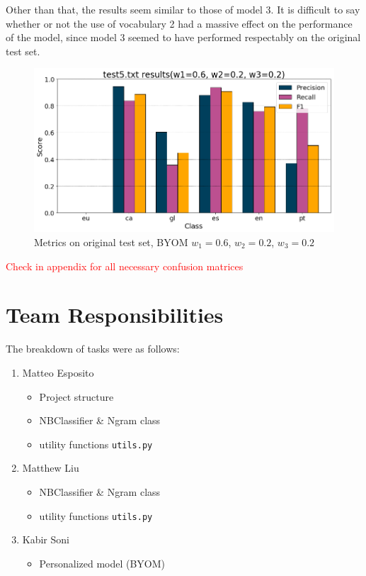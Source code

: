 \documentclass[runningheads]{llncs}
\newcommand{\code}[1]{\texttt{#1}}
\begin{document}
Other than that, the results seem similar to those of model 3. It is difficult to say whether or not the use of vocabulary 2 had a massive effect on the performance of the model, since model 3 seemed to have performed respectably on the original test set.

\begin{figure}
    \begin{center}
        \includegraphics[width=12.5cm]{images/test5_results_BYOM.png}
        \caption{Metrics on original test set, BYOM $w_1=0.6$, $w_2=0.2$, $w_3=0.2$}
        \label{fig:demo_BYOM}
    \end{center}
\end{figure}

\newpage

\textcolor{red}{Check in appendix for all necessary confusion matrices}

\section{Team Responsibilities}

The breakdown of tasks were as follows:

\begin{enumerate}
    \item Matteo Esposito
    \begin{itemize}
        \item Project structure
        \item NBClassifier \& Ngram class
        \item utility functions \code{utils.py}
    \end{itemize}
    \item Matthew Liu
    \begin{itemize}
        \item NBClassifier \& Ngram class
        \item utility functions \code{utils.py}
    \end{itemize}
    \item Kabir Soni
    \begin{itemize}
        \item Personalized model (BYOM)
    \end{itemize}
\end{enumerate}
\end{document}
